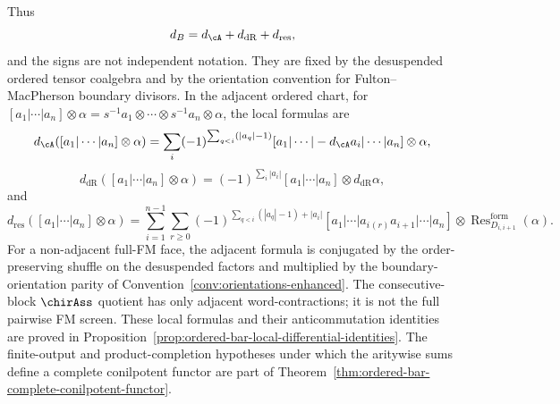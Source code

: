 \begin{definition}
Thus
\[
d_B=d_{\cA}+d_{\mathrm{dR}}+d_{\mathrm{res}},
\]
and the signs are not independent notation. They are fixed by the
desuspended ordered tensor coalgebra and by the orientation convention
for Fulton--MacPherson boundary divisors. In the adjacent ordered
chart, for
\([a_1|\cdots|a_n]\otimes\alpha
=s^{-1}a_1\otimes\cdots\otimes s^{-1}a_n\otimes\alpha\), the local
formulas are
\[
d_{\cA}([a_1|\cdots|a_n]\otimes\alpha)
=
\sum_i
(-1)^{\sum_{q<i}(|a_q|-1)}
[a_1|\cdots|-d_{\cA}a_i|\cdots|a_n]\otimes\alpha,
\]
\[
d_{\mathrm{dR}}([a_1|\cdots|a_n]\otimes\alpha)
=
(-1)^{\sum_i |a_i|}
[a_1|\cdots|a_n]\otimes d_{\mathrm{dR}}\alpha,
\]
and
\[
d_{\mathrm{res}}([a_1|\cdots|a_n]\otimes\alpha)
=
\sum_{i=1}^{n-1}\sum_{r\ge0}
(-1)^{\sum_{q<i}(|a_q|-1)+|a_i|}
[a_1|\cdots|a_i{}_{(r)}a_{i+1}|\cdots|a_n]
\otimes
\operatorname{Res}^{\mathrm{form}}_{D_{i,i+1}}(\alpha).
\]
For a non-adjacent full-FM face, the adjacent formula is conjugated by
the order-preserving shuffle on the desuspended factors and multiplied
by the boundary-orientation parity of
Convention~\ref{conv:orientations-enhanced}. The consecutive-block
\(\chirAss\) quotient has only adjacent word-contractions; it is not
the full pairwise FM screen. These local formulas and their
anticommutation identities are proved in
Proposition~\ref{prop:ordered-bar-local-differential-identities}. The
finite-output and product-completion hypotheses under which the
aritywise sums define a complete conilpotent functor are part of
Theorem~\ref{thm:ordered-bar-complete-conilpotent-functor}.

\end{definition}

